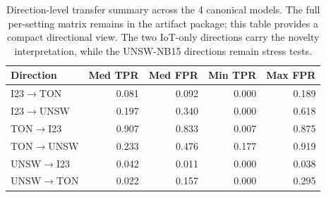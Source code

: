 \begin{table}[htbp]
\centering
\scriptsize
\setlength{\tabcolsep}{4pt}
\caption{Direction-level transfer summary across the 4 canonical models. The full per-setting matrix remains in the artifact package; this table provides a compact directional view. The two IoT-only directions carry the novelty interpretation, while the UNSW-NB15 directions remain stress tests.}
\label{tab:acsac-cross-summary}
\begin{tabular}{lrrrr}
\toprule
Direction & Med TPR & Med FPR & Min TPR & Max FPR \\
\midrule
I23$\to$TON & 0.081 & 0.092 & 0.000 & 0.189 \\
I23$\to$UNSW & 0.197 & 0.340 & 0.000 & 0.618 \\
TON$\to$I23 & 0.907 & 0.833 & 0.007 & 0.875 \\
TON$\to$UNSW & 0.233 & 0.476 & 0.177 & 0.919 \\
UNSW$\to$I23 & 0.042 & 0.011 & 0.000 & 0.038 \\
UNSW$\to$TON & 0.022 & 0.157 & 0.000 & 0.295 \\
\bottomrule
\end{tabular}
\end{table}
